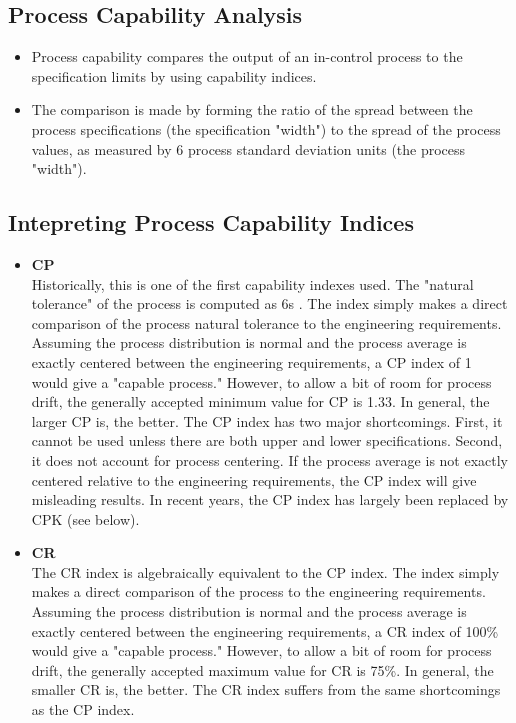 \documentclass[]{article}
\begin{document}
\subsection{Process Capability Analysis}
{
\large

\begin{itemize}
\item Process capability compares the output of an in-control process to the specification limits by using capability indices.
\item The comparison is made by forming the ratio of the spread between the process specifications (the specification "width") to the spread of the process values, as measured by 6 process standard deviation units (the process "width").
\end{itemize}
\newpage
\subsection{Intepreting Process Capability Indices}
\begin{itemize}
\item \textbf{CP}\\
Historically, this is one of the first capability indexes used. The "natural tolerance" of the process is computed as 6s . The index simply makes a direct comparison of the process natural tolerance to the engineering requirements. Assuming the process distribution is normal and the process average is exactly centered between the engineering requirements, a CP index of 1 would give a "capable process." However, to allow a bit of room for process drift, the generally accepted minimum value for CP is 1.33. In general, the larger CP is, the better. The CP index has two major shortcomings. First, it cannot be used unless there are both upper and lower specifications. Second, it does not account for process centering. If the process average is not exactly centered relative to the engineering requirements, the CP index will give misleading results. In recent years, the CP index has largely been replaced by CPK (see below).

\item \textbf{CR}\\
The CR index is algebraically equivalent to the CP index. The index simply makes a direct comparison of the process to the engineering requirements. Assuming the process distribution is normal and the process average is exactly centered between the engineering requirements, a CR index of 100\% would give a "capable process." However, to allow a bit of room for process drift, the generally accepted maximum value for CR is 75\%. In general, the smaller CR is, the better. The CR index suffers from the same shortcomings as the CP index.


\end{itemize}}
\end{document}
